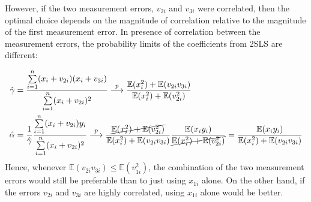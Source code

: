 \documentclass[]{article}
\begin{document}
However, if the two measurement errors, $v_{2i}$ and $v_{3i}$ were correlated, then the optimal choice depends on the magnitude of correlation relative to the magnitude of the first measurement error. In presence of correlation between the measurement errors, the probability limits of the coefficients from 2SLS are different:

\begin{equation}
	\begin{split}
		\hat{\gamma}& = \frac{\sum\limits_{i = 1}^n (x_i + v_{2i})(x_i + v_{3i})}{\sum\limits_{i = 1}^n (x_i + v_{2i})^2}\overset{p}{\longrightarrow} \frac{\mathbb{E}(x_i^2) + \mathbb{E}(v_{2i}v_{3i})}{\mathbb{E}(x_i^2) + \mathbb{E}(v_{2i}^2)} \\ \nonumber
		\hat{\alpha}& = \frac{1}{\hat{\gamma}}\frac{\sum\limits_{i = 1}^n(x_i + v_{2i})y_i}{\sum\limits_{i = 1}^n(x_i + v_{2i})^2} \overset{p}{\longrightarrow}\frac{\cancel{\mathbb{E}(x_i^2) + \mathbb{E}(v_{2i}^2)}}{\mathbb{E}(x_i^2) + \mathbb{E}(v_{2i}v_{3i})}\frac{\mathbb{E}(x_iy_i)}{\cancel{\mathbb{E}(x_i^2) + \mathbb{E}(v_{2i}^2)}} = \frac{\mathbb{E}(x_iy_i)}{\mathbb{E}(x_i^2) + \mathbb{E}(v_{2i}v_{3i})}
	\end{split}
\end{equation}
Hence, whenever $\mathbb{E}(v_{2i}v_{3i})\leq\mathbb{E}(v_{1i}^2)$, the combination of the two measurement errors would still be preferable than to just using $x_{1i}$ alone. On the other hand, if the errors $v_{2i}$ and $v_{3i}$ are highly correlated, using $x_{1i}$ alone would be better.
\end{document}
